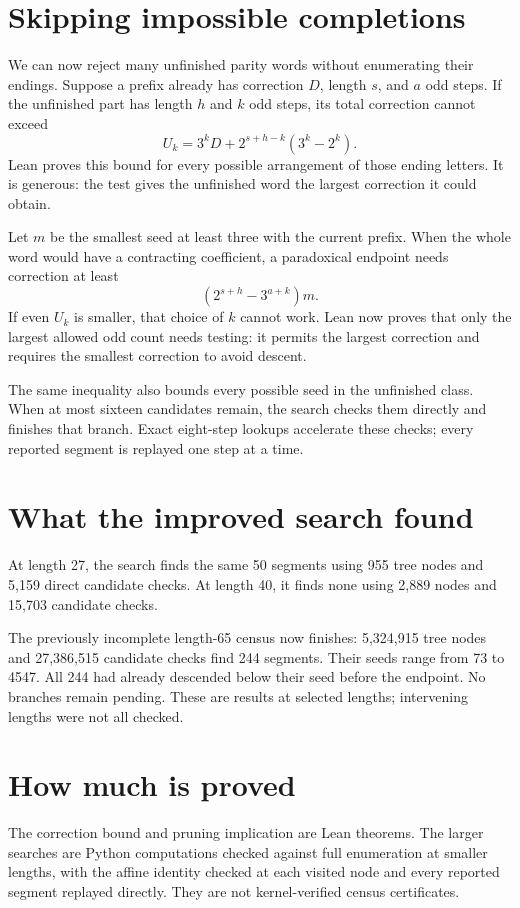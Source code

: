 \documentclass[10pt]{article}
\begin{document}
\newpage
\section{Skipping impossible completions}
We can now reject many unfinished parity words without enumerating their endings. Suppose a prefix already has correction $D$, length $s$, and $a$ odd steps. If the unfinished part has length $h$ and $k$ odd steps, its total correction cannot exceed
\[
U_k=3^kD+2^{s+h-k}(3^k-2^k).
\]
Lean proves this bound for every possible arrangement of those ending letters. It is generous: the test gives the unfinished word the largest correction it could obtain.

Let $m$ be the smallest seed at least three with the current prefix. When the whole word would have a contracting coefficient, a paradoxical endpoint needs correction at least
\[
(2^{s+h}-3^{a+k})m.
\]
If even $U_k$ is smaller, that choice of $k$ cannot work. Lean now proves
that only the largest allowed odd count needs testing: it permits the
largest correction and requires the smallest correction to avoid descent.

The same inequality also bounds every possible seed in the unfinished
class. When at most sixteen candidates remain, the search checks them
directly and finishes that branch. Exact eight-step lookups accelerate
these checks; every reported segment is replayed one step at a time.

\section{What the improved search found}
At length 27, the search finds the same 50 segments using 955 tree nodes
and 5,159 direct candidate checks. At length 40, it finds none using 2,889
nodes and 15,703 candidate checks.

The previously incomplete length-65 census now finishes: 5,324,915 tree
nodes and 27,386,515 candidate checks find 244 segments. Their seeds range
from 73 to 4547. All 244 had already descended below their seed before the
endpoint. No branches remain pending. These are results at selected
lengths; intervening lengths were not all checked.

\section{How much is proved}
The correction bound and pruning implication are Lean theorems. The larger searches are Python computations checked against full enumeration at smaller lengths, with the affine identity checked at each visited node and every reported segment replayed directly. They are not kernel-verified census certificates.
\end{document}
